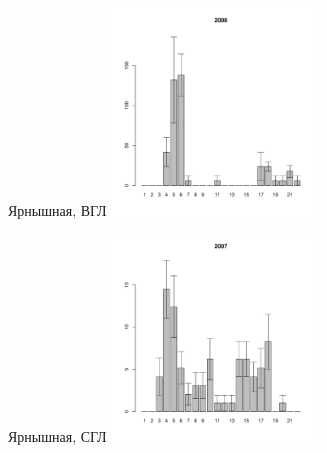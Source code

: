 	\begin{figure}[h]
	
	\begin{minipage}[b]{.46\linewidth}
	\begin{center}
	{\footnotesize Ярнышная, ВГЛ}
	\includegraphics[width=55mm]{../Barenc_Sea/Yarnyshnaya/high_2008_.pdf}
	\end{center}
	\end{minipage}
	\hfil %
	\begin{minipage}[b]{.46\linewidth}
	\begin{center}
	{\footnotesize Ярнышная, СГЛ}
	\includegraphics[width=55mm]{../Barenc_Sea/Yarnyshnaya/middle_2007_.pdf}
	\end{center}
	\end{minipage}
	\begin{minipage}[b]{.46\linewidth}


\end{minipage}
\end{figure}
